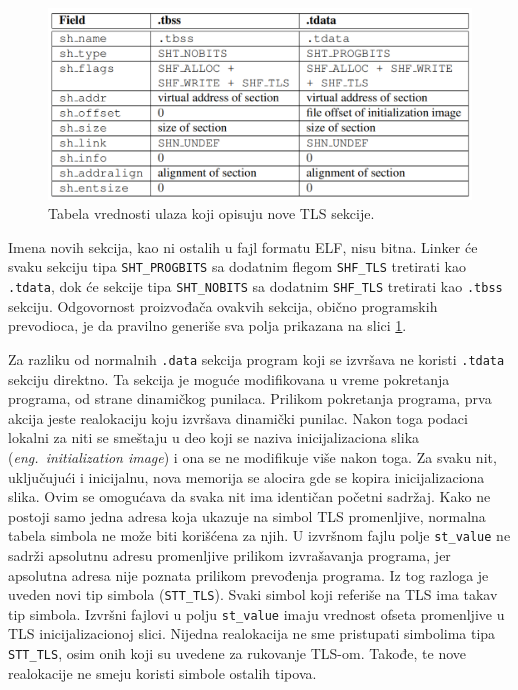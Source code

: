 \documentclass[12pt,oneside]{memoir}
\begin{document}
\begin{figure}[h!]
	\begin{center}
		\includegraphics[scale=0.6]{slike/tabela1elfTLS.png}
	\end{center}
	\caption{Tabela vrednosti ulaza koji opisuju nove TLS sekcije.}
	\label{fig:tls_secs}
\end{figure}

Imena novih sekcija, kao ni ostalih u fajl formatu ELF, nisu bitna. Linker će svaku sekciju tipa \texttt{SHT\_PROGBITS} sa dodatnim flegom \texttt{SHF\_TLS} tretirati kao \texttt{.tdata}, dok će sekcije tipa \texttt{SHT\_NOBITS} sa dodatnim \texttt{SHF\_TLS} tretirati kao \texttt{.tbss} sekciju. Odgovornost proizvođača ovakvih sekcija, obično programskih prevodioca, je da pravilno generiše sva polja prikazana na slici \ref{fig:tls_secs}.

Za razliku od normalnih \texttt{.data} sekcija program koji se izvršava ne koristi \texttt{.tdata} sekciju direktno. Ta sekcija je moguće modifikovana u vreme pokretanja programa, od strane dinamičkog punilaca. Prilikom pokretanja programa, prva akcija jeste realokaciju koju izvršava dinamički punilac. Nakon toga podaci lokalni za niti se smeštaju u deo koji se naziva inicijalizaciona slika (\emph{eng.~initialization image}) i ona se ne modifikuje više nakon toga. Za svaku nit, uključujući i inicijalnu, nova memorija se alocira gde se kopira inicijalizaciona slika. Ovim se omogućava da svaka nit ima identičan početni sadržaj. Kako ne postoji samo jedna adresa koja ukazuje na simbol TLS promenljive, normalna tabela simbola ne može biti korišćena za njih. U izvršnom fajlu polje \texttt{st\_value} ne sadrži apsolutnu adresu promenljive prilikom izvrašavanja programa, jer apsolutna adresa nije poznata prilikom prevođenja programa. Iz tog razloga  je uveden novi tip simbola (\texttt{STT\_TLS}). Svaki simbol koji referiše na TLS ima takav tip simbola. Izvršni fajlovi u polju \texttt{st\_value} imaju vrednost ofseta promenljive u TLS inicijalizacionoj slici.
Nijedna realokacija ne sme pristupati simbolima tipa \texttt{STT\_TLS}, osim onih koji su uvedene za rukovanje TLS-om. Takođe, te nove realokacije ne smeju koristi simbole ostalih tipova.
\end{document}
